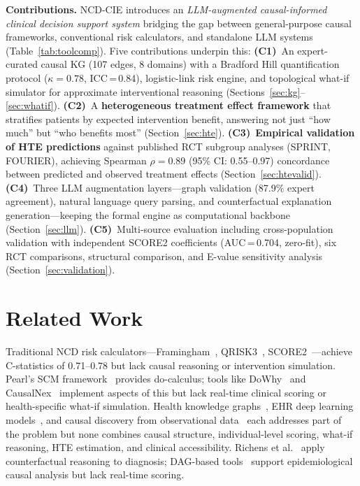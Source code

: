 \documentclass[runningheads]{llncs}
\begin{document}
\noindent\textbf{Contributions.}
NCD-CIE introduces an \emph{LLM-augmented causal-informed clinical
decision support system} bridging the gap between general-purpose causal
frameworks, conventional risk calculators, and standalone LLM systems
(Table~\ref{tab:toolcomp}).
Five contributions underpin this:
\textbf{(C1)}~An expert-curated causal KG (107 edges, 8 domains)
with a Bradford Hill quantification protocol ($\kappa=0.78$,
ICC\,=\,0.84), logistic-link risk engine, and topological what-if
simulator for approximate interventional reasoning
(Sections~\ref{sec:kg}--\ref{sec:whatif}).
\textbf{(C2)}~A \textbf{heterogeneous treatment effect framework}
that stratifies patients by expected intervention benefit, answering
not just ``how much'' but ``who benefits most''
(Section~\ref{sec:hte}).
\textbf{(C3)}~\textbf{Empirical validation of HTE predictions}
against published RCT subgroup analyses (SPRINT, FOURIER), achieving
Spearman $\rho = 0.89$ (95\% CI: 0.55--0.97) concordance between
predicted and observed treatment effects (Section~\ref{sec:htevalid}).
\textbf{(C4)}~Three LLM augmentation layers---graph validation
(87.9\% expert agreement), natural language query parsing, and
counterfactual explanation generation---keeping the formal engine
as computational backbone (Section~\ref{sec:llm}).
\textbf{(C5)}~Multi-source evaluation including cross-population
validation with independent SCORE2 coefficients
(AUC\,=\,0.704, zero-fit), six RCT comparisons,
structural comparison, and E-value sensitivity analysis
(Section~\ref{sec:validation}).

\section{Related Work}\label{sec:related}

Traditional NCD risk calculators---Framingham~\cite{dagostino2008},
QRISK3~\cite{hippisley2017qrisk3}, SCORE2~\cite{score22021}---achieve
C-statistics of 0.71--0.78 but lack causal reasoning or intervention
simulation.
Pearl's SCM framework~\cite{pearl2009causality,hernan2020causal}
provides do-calculus; tools like DoWhy~\cite{sharma2020dowhy} and
CausalNex~\cite{beaumont2021causalnex} implement aspects of this but
lack real-time clinical scoring or health-specific what-if simulation.
Health knowledge graphs~\cite{chandak2023primekg,barabasi2011network},
EHR deep learning models~\cite{li2020behrt,rasmy2021medbert}, and
causal discovery from observational data~\cite{prosperi2020causal}
each addresses part of the problem but none combines causal structure,
individual-level scoring, what-if reasoning, HTE estimation, and clinical
accessibility.
Richens et al.~\cite{richens2020causal} apply counterfactual
reasoning to diagnosis; DAG-based tools~\cite{textor2016dagitty}
support epidemiological causal analysis but lack real-time scoring.
\end{document}
